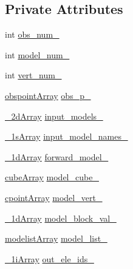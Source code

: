 \subsection*{Private Attributes}
\begin{DoxyCompactItemize}
\item 
int \mbox{\hyperlink{class_g_m3_d_a0a99aace28a165695d8ba0529c7661bd}{obs\+\_\+num\+\_\+}}
\item 
int \mbox{\hyperlink{class_g_m3_d_a005361a133eeedffc2d8b2e5b2016a4c}{model\+\_\+num\+\_\+}}
\item 
int \mbox{\hyperlink{class_g_m3_d_a64bfe5d2982d27a0416bc5a03d96c277}{vert\+\_\+num\+\_\+}}
\item 
\mbox{\hyperlink{head__func_8h_a8cfaa8be830903eddff69eafbefbec05}{obspoint\+Array}} \mbox{\hyperlink{class_g_m3_d_a27dee47e8ed7458680f53cd10b6d7180}{obs\+\_\+p\+\_\+}}
\item 
\mbox{\hyperlink{head__func_8h_aca123327d645334fb79bed52b3cda2b9}{\+\_\+2d\+Array}} \mbox{\hyperlink{class_g_m3_d_a52e40fcb10325d064e8a4722484092fe}{input\+\_\+models\+\_\+}}
\item 
\mbox{\hyperlink{head__func_8h_a6294167a90c8ef0fa3236f237dd0dcec}{\+\_\+1s\+Array}} \mbox{\hyperlink{class_g_m3_d_adb40fbb23d004d5822b2e52e6b0ec9f7}{input\+\_\+model\+\_\+names\+\_\+}}
\item 
\mbox{\hyperlink{head__func_8h_ad98e111309150a71ccfa43e4adbbad21}{\+\_\+1d\+Array}} \mbox{\hyperlink{class_g_m3_d_a75c411fe8ce6d7b38005d60962f8a2ab}{forward\+\_\+model\+\_\+}}
\item 
\mbox{\hyperlink{head__func_8h_a0b73a679a269c470465eb862fb43ab33}{cube\+Array}} \mbox{\hyperlink{class_g_m3_d_af28fd86ad149f276a33e465a01edd4f3}{model\+\_\+cube\+\_\+}}
\item 
\mbox{\hyperlink{head__func_8h_aa7b92de3a34382fdc6a258a2368eb513}{cpoint\+Array}} \mbox{\hyperlink{class_g_m3_d_ae15aa6e3b449916c3195490a4627ae02}{model\+\_\+vert\+\_\+}}
\item 
\mbox{\hyperlink{head__func_8h_ad98e111309150a71ccfa43e4adbbad21}{\+\_\+1d\+Array}} \mbox{\hyperlink{class_g_m3_d_a23a1f763de550b8548e73851f3a59482}{model\+\_\+block\+\_\+val\+\_\+}}
\item 
\mbox{\hyperlink{head__func_8h_a67c2c11cfcc1333d195a0c79af9e6dfc}{modelist\+Array}} \mbox{\hyperlink{class_g_m3_d_a229472281d8b8dd779b70842c44fff34}{model\+\_\+list\+\_\+}}
\item 
\mbox{\hyperlink{head__func_8h_a9e4349f40fb03f26073ea0d8c99d4704}{\+\_\+1i\+Array}} \mbox{\hyperlink{class_g_m3_d_a0c107609a2e837c7aeeef24a977af1ed}{out\+\_\+ele\+\_\+ids\+\_\+}}

\end{DoxyCompactItemize}
